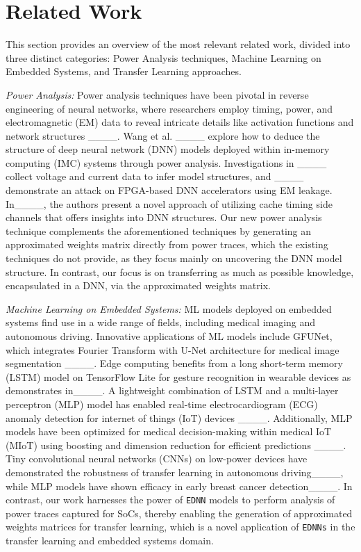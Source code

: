 \section{Related Work}
\label{sec:RelatedWork}
This section provides an overview of the most relevant related work, divided into three distinct categories: Power Analysis techniques, Machine Learning on Embedded Systems, and Transfer Learning approaches.

\emph{Power Analysis:}
Power analysis techniques have been pivotal in reverse engineering of neural networks, where researchers employ timing, power, and electromagnetic (EM) data to reveal intricate details like activation functions and network structures ____. Wang et al. ____ explore how to deduce the structure of deep neural network (DNN) models deployed within in-memory computing (IMC) systems through power analysis. Investigations in ____ collect voltage and current data to infer model structures, and ____ demonstrate an attack on FPGA-based DNN accelerators using EM leakage. In____, the authors present a novel approach of utilizing cache timing side channels that offers insights into DNN structures. Our new power analysis technique complements the aforementioned techniques by generating an approximated weights matrix directly from power traces, which the existing techniques do not provide, as they focus mainly on uncovering the DNN model structure. In contrast, our focus is on transferring as much as possible knowledge, encapsulated in a DNN, via the approximated weights matrix. 

\emph{Machine Learning on Embedded Systems:}
ML models deployed on embedded systems find use in a wide range of fields, including medical imaging and autonomous driving. Innovative applications of ML models include GFUNet, which integrates Fourier Transform with U-Net architecture for medical image segmentation ____. Edge computing benefits from a long short-term memory (LSTM) model on TensorFlow Lite for gesture recognition in wearable devices as demonstrates in____. A lightweight combination of LSTM and a multi-layer perceptron (MLP) model has enabled real-time electrocardiogram (ECG) anomaly detection for internet of things (IoT) devices ____. Additionally, MLP models have been optimized for medical decision-making within medical IoT (MIoT) using boosting and dimension reduction for efficient predictions ____. Tiny convolutional neural networks (CNNs) on low-power devices have demonstrated the robustness of transfer learning in autonomous driving____, while MLP models have shown efficacy in early breast cancer detection____. In contrast, our work harnesses the power of \texttt{EDNN} models to perform analysis of power traces captured for SoCs, thereby enabling the generation of approximated weights matrices for transfer learning, which is a novel application of \texttt{EDNNs} in the transfer learning and embedded systems domain.

